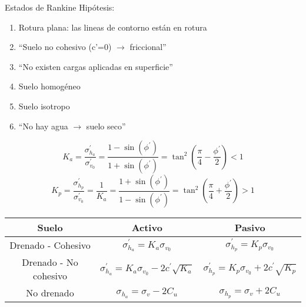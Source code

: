 \begin{mybox}{Estados de Rankine}
	Hipótesis:
	\begin{enumerate}
		\item Rotura plana: las lineas de contorno están en rotura 
		\item ``Suelo no cohesivo (c’=0) $\rightarrow$ friccional''
		\item ``No existen cargas aplicadas en superficie''
		\item Suelo homogéneo
		\item Suelo isotropo
		\item ``No hay agua $\rightarrow$ suelo seco''
	\end{enumerate}

	\[
		K_a = \frac{\sigma_{h_a}^\prime}{\sigma_{v_0}^\prime} = \frac{1-\sin(\phi^\prime)}{1+\sin(\phi^\prime)} = \tan^2\left(\frac{\pi}{4} - \frac{\phi^\prime}{2}\right) <1
	\]	
	\[
		K_p = \frac{\sigma_{h_p}^\prime}{\sigma_{v_0}^\prime} = \frac{1}{K_a} = \frac{1+\sin(\phi^\prime)}{1-\sin(\phi^\prime)} = \tan^2\left(\frac{\pi}{4} + \frac{\phi^\prime}{2}\right) >1
	\]	

	\begin{table}[H]
	\centering
	\begin{tabular}{ccc}
	\toprule
	Suelo & Activo & Pasivo \\
	\midrule
	Drenado - Cohesivo & $\sigma_{h_a}^\prime = K_a \sigma_{v_0}$ & $\sigma_{h_p}^\prime = K_p \sigma_{v_0}$ \\
	Drenado - No cohesivo & $\sigma_{h_a}^\prime = K_a \sigma_{v_0} - 2c^\prime \sqrt{K_a}$ &  $\sigma_{h_p}^\prime = K_p \sigma_{v_0}+ 2c^\prime \sqrt{K_p}$  \\
	No drenado & $\sigma_{h_a} = \sigma_v - 2C_u$& $\sigma_{h_p} = \sigma_v + 2C_u$ \\
	\bottomrule
	\end{tabular}
	\end{table}
\end{mybox}

